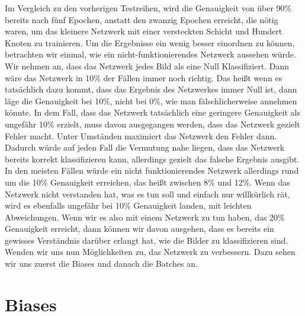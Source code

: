 \documentclass[12pt]{article}
\begin{document}
Im Vergleich zu den vorherigen Testreihen, wird die Genauigkeit von über 90\% bereits nach fünf Epochen, anstatt den zwanzig Epochen erreicht, die nötig waren, um das kleinere Netzwerk mit einer versteckten Schicht und Hundert Knoten zu trainieren. Um die Ergebnisse ein wenig besser einordnen zu können, betrachten wir einmal, wie ein nicht-funktionierendes Netzwerk aussehen würde. Wir nehmen an, dass das Netzwerk jedes Bild als eine Null Klassifiziert. Dann wäre das Netzwerk in 10\% der Fällen immer noch richtig. Das heißt wenn es tatsächlich dazu kommt, dass das Ergebnis des Netzwerkes immer Null ist, dann läge die Genauigkeit bei 10\%, nicht bei 0\%, wie man fälschlicherweise annehmen könnte. In dem Fall, dass das Netzwerk tatsächlich eine geringere Genauigkeit als ungefähr 10\% erzielt, muss davon ausgegangen werden, dass das Netzwerk gezielt Fehler macht. Unter Umständen maximiert das Netzwerk den Fehler dann. Dadurch würde auf jeden Fall die Vermutung nahe liegen, dass das Netzwerk bereits korrekt klassifizieren kann, allerdings gezielt das falsche Ergebnis ausgibt. In den meisten Fällen würde ein nicht funktionierendes Netzwerk allerdings rund um die 10\% Genauigkeit erreichen, das heißt zwischen 8\% und 12\%. Wenn das Netzwerk nicht verstanden hat, was es tun soll und einfach nur willkürlich rät, wird es ebenfalls ungefähr bei 10\% Genauigkeit landen, mit leichten Abweichungen. Wenn wir es also mit einem Netzwerk zu tun haben, das 20\% Genauigkeit erreicht, dann können wir davon ausgehen, dass es bereits ein gewisses Verständnis darüber erlangt hat, wie die Bilder zu klassifizieren sind. Wenden wir uns nun Möglichkeiten zu, das Netzwerk zu verbessern. Dazu sehen wir uns zuerst die Biases und danach die Batches an.\section{Biases}
\end{document}
